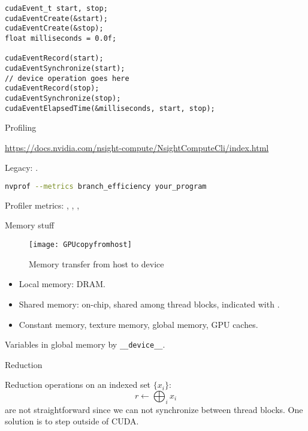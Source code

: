 \begin{lstlisting}
cudaEvent_t start, stop;
cudaEventCreate(&start);
cudaEventCreate(&stop);
float milliseconds = 0.0f;
 
cudaEventRecord(start);
cudaEventSynchronize(start);
// device operation goes here
cudaEventRecord(stop);
cudaEventSynchronize(stop);
cudaEventElapsedTime(&milliseconds, start, stop);
\end{lstlisting}

 {Profiling}

\url{https://docs.nvidia.com/nsight-compute/NsightComputeCli/index.html}

\begin{remark}
  Legacy: .
\begin{lstlisting}[language=bash]
nvprof --metrics branch_efficiency your_program
\end{lstlisting}
\end{remark}

Profiler metrics:
,
,
,

 {Memory stuff}

\begin{figure}[ht]
  \texttt{[image: GPUcopyfromhost]}
  \caption{Memory transfer from host to device}
\end{figure}


\begin{itemize}
\item Local memory: DRAM.
\item Shared memory: on-chip, shared among thread blocks,
  indicated with .
\item Constant memory, texture memory, global memory, GPU caches.
\end{itemize}

Variables in global memory by \lstinline{__device__}.

 {Reduction}
\label{sec:cu-reduce}

Reduction operations on an indexed set $\{x_i\}$:
\[ r\leftarrow \bigoplus_i x_i \]
are not straightforward since we can not
synchronize between thread blocks.
One solution is to step outside of CUDA.


